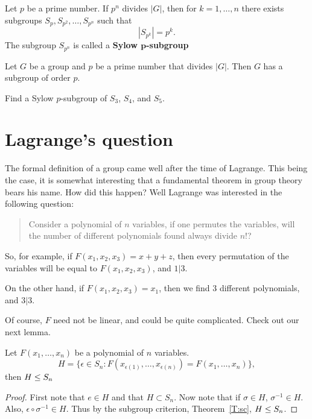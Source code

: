 \documentclass{ximera}
\begin{document}
\begin{theorem}
  Let $p$ be a prime number. If $p^n$ divides $|G|$, then for $k =
  1,\dots, n$ there exists subgroups $S_p, S_{p^2},\dots,S_{p^n}$ such
  that
  \[
  |S_{p^k}| = p^k.
  \]
  The subgroup $S_{p^n}$ is called a \textbf{Sylow
    $\boldsymbol{p}$-subgroup}
\end{theorem}

\begin{corollary}
  Let $G$ be a group and $p$ be a prime number that divides
  $|G|$. Then $G$ has a subgroup of order $p$.
\end{corollary}

\begin{exercise}
  Find a Sylow $p$-subgroup of $S_3$, $S_4$, and $S_5$.
\end{exercise}





\section{Lagrange's question}

The formal definition of a group came well after the time of
Lagrange. This being the case, it is somewhat interesting that a
fundamental theorem in group theory bears his name. How did this
happen? Well Lagrange was interested in the following question:


\begin{quote}
  Consider a polynomial of $n$ variables, if one permutes the
  variables, will the number of different polynomials found always
  divide $n!$?
\end{quote}

So, for example, if $F(x_1,x_2,x_3) = x+ y+z$, then every permutation
of the variables will be equal to $F(x_1,x_2,x_3)$, and $1|3$.

On the other hand, if $F(x_1,x_2,x_3) = x_1$, then we find $3$
different polynomials, and $3|3$.

Of course, $F$ need not be linear, and could be quite
complicated. Check out our next lemma.



\begin{lemma}
  Let $F(x_1,\dots,x_n)$ be a polynomial of $n$ variables.
  \[
  H = \{\epsilon\in S_n: F(x_{\epsilon(1)},\dots, x_{\epsilon(n)}) = F(x_1,\dots,x_n)\},
  \]
  then $H\leq S_n$
  \begin{proof}
    First note that $e\in H$ and that $H\subset S_n$. Now note that if
    $\sigma\in H$, $\sigma^{-1}\in H$. Also, $\epsilon\circ \sigma^{-1}\in
    H$. Thus by the subgroup criterion, Theorem~\ref{T:sc}, $H\leq
    S_n$.
  \end{proof}
\end{lemma}
\end{document}
